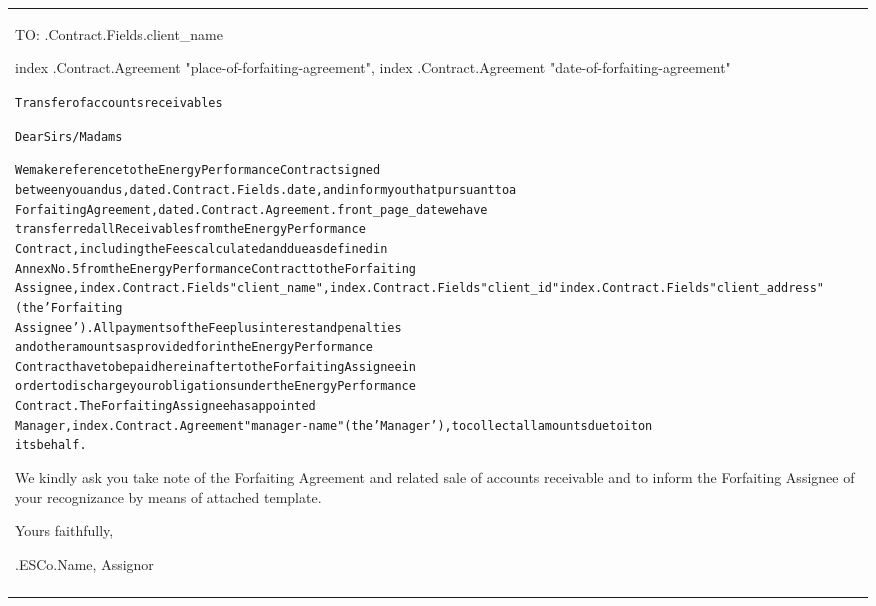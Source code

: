 \documentclass[a4paper]{article}
\begin{document}
\begin{tabu}{|X|} \tabucline{}

  TO: {{.Contract.Fields.client_name}} \par

  \begin{flushright}
    {{index .Contract.Agreement "place-of-forfaiting-agreement"}}, {{index .Contract.Agreement "date-of-forfaiting-agreement"}}
  \end{flushright}

  \begin{alltt}  Transfer of accounts receivables



    Dear Sirs/Madams



    % TODO: @edimov Fix manager-name to be input %
    We make reference to the Energy Performance Contract signed
    between you and us, dated  {{.Contract.Fields.date}}, and inform you that pursuant to a
    Forfaiting Agreement, dated  {{.Contract.Agreement.front_page_date}} we have
     transferred all Receivables from the Energy Performance
    Contract, including the Fees calculated and due as defined in
    Annex No. 5 from the Energy Performance Contract to the Forfaiting
    Assignee,  {{index .Contract.Fields "client_name"}},  {{index .Contract.Fields "client_id"}}  {{index .Contract.Fields "client_address"}} (the 'Forfaiting
    Assignee'). All payments of the Fee plus interest and penalties
    and other amounts as provided for in the Energy Performance
    Contract have to be paid hereinafter to the Forfaiting Assignee in
    order to discharge your obligations under the Energy Performance
    Contract. The Forfaiting Assignee has appointed
    Manager,  {{index .Contract.Agreement "manager-name"}} (the 'Manager'), to collect all amounts due to it on
    its behalf.

  \end{alltt}

  \vspace{5mm}

  We kindly ask you take note of the Forfaiting Agreement and related
  sale of accounts receivable and to inform the Forfaiting Assignee of
  your recognizance by means of attached template.

  \vspace{1cm}

  Yours faithfully,

  \vspace{1cm}

   {{.ESCo.Name}}, Assignor

  \vspace{1cm} \\\tabucline{}

\end{tabu}
\end{document}
